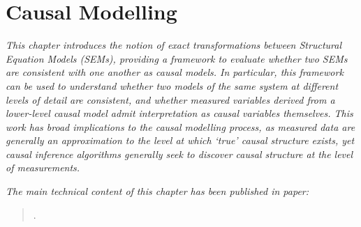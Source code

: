 \chapter{Causal Modelling}\label{chapter:causality}

\ifpdf
    \graphicspath{{Chapter3/Figs/Raster/}{Chapter3/Figs/PDF/}{Chapter3/Figs/}}
\else
    \graphicspath{{Chapter3/Figs/Vector/}{Chapter3/Figs/}}
\fi

\emph{This chapter introduces the notion of \emph{exact transformations} between Structural Equation Models (SEMs), providing a framework to evaluate whether two SEMs are consistent with one another as causal models.
In particular, this framework can be used to understand whether two models of the same system at different levels of detail are consistent, and whether measured variables derived from a lower-level causal model admit interpretation as causal variables themselves.
This work has broad implications to the causal modelling process, as measured data are generally an approximation to the level at which `true' causal structure exists, yet causal inference algorithms generally seek to discover causal structure at the level of measurements.}


\emph{The main technical content of this chapter has been published in paper:}


\begin{quote}
.
\end{quote}
%
%
%
%
%
%
%

